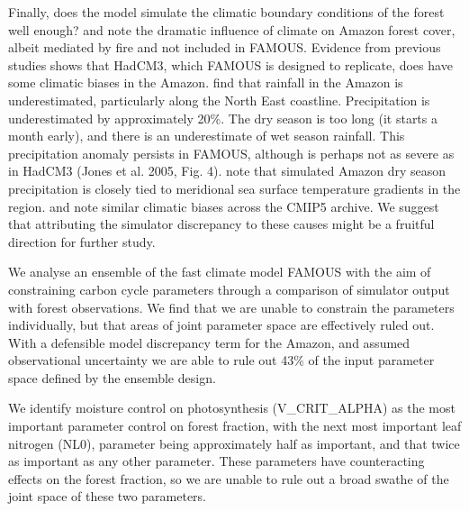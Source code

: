 \documentclass[esd, manuscript]{copernicus}
\begin{document}
Finally, does the model simulate the climatic boundary conditions of the forest well enough? \cite{malhi2009amazon} and \cite{staver2011determinants} note the dramatic influence of climate on Amazon forest cover, albeit mediated by fire and not included in FAMOUS. Evidence from previous studies shows that HadCM3, which FAMOUS is designed to replicate, does have some climatic biases in the Amazon. \cite{cox2004amazon} find that rainfall in the Amazon is underestimated, particularly along the North East coastline. Precipitation is underestimated by approximately 20\%. The dry season is too long (it starts a month early), and there is an underestimate of wet season rainfall. This precipitation anomaly persists in FAMOUS, although is perhaps not as severe as in HadCM3 (Jones et al. 2005, Fig.  4). \cite{good2008objective} note that simulated Amazon dry season precipitation is closely tied to meridional sea surface temperature gradients in the region. \cite{joetzjer2013amazon} and \cite{yin2012precipitation} note similar climatic biases across the CMIP5 archive. We suggest that attributing the simulator discrepancy to these causes might be a fruitful direction for further study.

\conclusions \label{sec:conclusions} %

We analyse an ensemble of the fast climate model FAMOUS with the aim of constraining carbon cycle parameters through a comparison of simulator output with forest observations. We find that we are unable to constrain the parameters individually, but that areas of joint parameter space are effectively ruled out. With a defensible model discrepancy term for the Amazon, and assumed observational uncertainty we are able to rule out 43\% of the input parameter space defined by the ensemble design.

We identify moisture control on photosynthesis (V\_CRIT\_ALPHA) as the most important parameter control on forest fraction, with the next most important leaf nitrogen (NL0), parameter being approximately half as important, and that twice as important as any other parameter. These parameters have counteracting effects on the forest fraction, so we are unable to rule out a broad swathe of the joint space of these two parameters.
\end{document}
